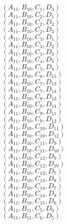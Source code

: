 \documentclass[14pt]{article}
\begin{document}
    $({A}_{11}, {B}_{10}, {C}_{1}, {D}_{3}) $ \\ 
    $({A}_{11}, {B}_{10}, {C}_{2}, {D}_{1}) $ \\ 
    $({A}_{11}, {B}_{10}, {C}_{2}, {D}_{2}) $ \\ 
    $({A}_{11}, {B}_{10}, {C}_{2}, {D}_{3}) $ \\ 
    $({A}_{11}, {B}_{10}, {C}_{3}, {D}_{1}) $ \\ 
    $({A}_{11}, {B}_{10}, {C}_{3}, {D}_{2}) $ \\ 
    $({A}_{11}, {B}_{10}, {C}_{3}, {D}_{3}) $ \\ 
    $({A}_{11}, {B}_{10}, {C}_{4}, {D}_{5}) $ \\ 
    $({A}_{11}, {B}_{10}, {C}_{5}, {D}_{4}) $ \\ 
    $({A}_{11}, {B}_{10}, {C}_{6}, {D}_{15}) $ \\ 
    $({A}_{11}, {B}_{10}, {C}_{7}, {D}_{13}) $ \\ 
    $({A}_{11}, {B}_{10}, {C}_{7}, {D}_{14}) $ \\ 
    $({A}_{11}, {B}_{10}, {C}_{8}, {D}_{13}) $ \\ 
    $({A}_{11}, {B}_{10}, {C}_{8}, {D}_{14}) $ \\ 
    $({A}_{11}, {B}_{10}, {C}_{9}, {D}_{11}) $ \\ 
    $({A}_{11}, {B}_{10}, {C}_{9}, {D}_{12}) $ \\ 
    $({A}_{11}, {B}_{10}, {C}_{10}, {D}_{11}) $ \\ 
    $({A}_{11}, {B}_{10}, {C}_{10}, {D}_{12}) $ \\ 
    $({A}_{11}, {B}_{10}, {C}_{11}, {D}_{9}) $ \\ 
    $({A}_{11}, {B}_{10}, {C}_{11}, {D}_{10}) $ \\ 
    $({A}_{11}, {B}_{10}, {C}_{12}, {D}_{9}) $ \\ 
    $({A}_{11}, {B}_{10}, {C}_{12}, {D}_{10}) $ \\ 
    $({A}_{11}, {B}_{10}, {C}_{13}, {D}_{7}) $ \\ 
    $({A}_{11}, {B}_{10}, {C}_{13}, {D}_{8}) $ \\ 
    $({A}_{11}, {B}_{10}, {C}_{14}, {D}_{7}) $ \\ 
    $({A}_{11}, {B}_{10}, {C}_{14}, {D}_{8}) $ \\ 
    $({A}_{11}, {B}_{10}, {C}_{15}, {D}_{6}) $ \\ 
    $({A}_{11}, {B}_{11}, {C}_{5}, {D}_{6}) $ \\ 
    $({A}_{11}, {B}_{11}, {C}_{6}, {D}_{5}) $ \\ 
\end{document}
